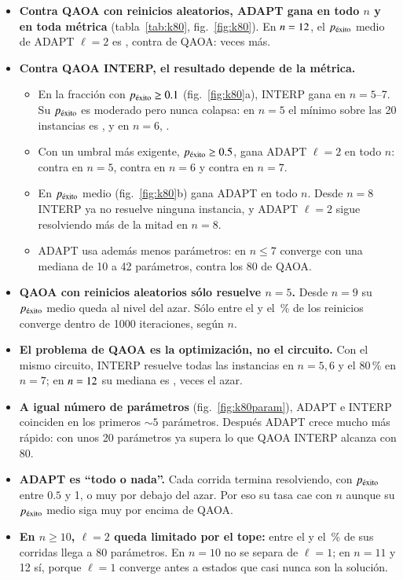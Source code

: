 \documentclass[11pt,a4paper]{article}
\newcommand{\pex}{p_{\rm \acute{e}xito}}
\begin{document}
\begin{itemize}
\item \textbf{Contra QAOA con reinicios aleatorios, ADAPT gana en todo $n$ y en toda métrica}
  (tabla~\ref{tab:k80}, fig.~\ref{fig:k80}). En $n=12$, el $\pex$ medio de ADAPT $\ell=2$ es
  \KMediaDosNmax{}, contra \KMediaQaoaNmax{} de QAOA: \KRazonNmax{} veces más.
\item \textbf{Contra QAOA INTERP, el resultado depende de la métrica.}
  \begin{itemize}
  \item En la fracción con $\pex\geq0.1$ (fig.~\ref{fig:k80}a), INTERP gana en $n=5$--7. Su $\pex$
    es moderado pero nunca colapsa: en $n=5$ el mínimo sobre las 20 instancias es
    \KMinInterpCinco, y en $n=6$, \KMinInterpSeis.
  \item Con un umbral más exigente, $\pex\geq0.5$, gana ADAPT $\ell=2$ en todo $n$: \KMedioAdaptCinco{}
    contra \KMedioInterpCinco{} en $n=5$, \KMedioAdaptSeis{} contra \KMedioInterpSeis{} en $n=6$ y
    \KMedioAdaptSiete{} contra \KMedioInterpSiete{} en $n=7$.
  \item En $\pex$ medio (fig.~\ref{fig:k80}b) gana ADAPT en todo $n$. Desde $n=8$ INTERP ya no
    resuelve ninguna instancia, y ADAPT $\ell=2$ sigue resolviendo más de la mitad en $n=8$.
  \item ADAPT usa además menos parámetros: en $n\leq7$ converge con una mediana de 10 a 42 parámetros, contra
    los 80 de QAOA.
  \end{itemize}
\item \textbf{QAOA con reinicios aleatorios sólo resuelve $n=5$.} Desde $n=9$ su $\pex$ medio queda
  al nivel del azar. Sólo entre el \KQaoaConvMin{} y el \KQaoaConvMax\,\% de los reinicios converge
  dentro de 1000 iteraciones, según $n$.
\item \textbf{El problema de QAOA es la optimización, no el circuito.} Con el mismo circuito, INTERP
  resuelve todas las instancias en $n=5,6$ y el 80\,\% en $n=7$; en $n=12$ su mediana es
  \KInterpMediana, \KInterpRazon{} veces el azar.
\item \textbf{A igual número de parámetros} (fig.~\ref{fig:k80param}), ADAPT e INTERP coinciden en los
  primeros $\sim5$ parámetros. Después ADAPT crece mucho más rápido: con unos 20 parámetros ya
  supera lo que QAOA INTERP alcanza con 80.
\item \textbf{ADAPT es ``todo o nada''.} Cada corrida termina resolviendo, con $\pex$ entre $0.5$ y
  1, o muy por debajo del azar. Por eso su tasa cae con $n$ aunque su $\pex$ medio siga muy por
  encima de QAOA.
\item \textbf{En $n\geq10$, $\ell=2$ queda limitado por el tope:} entre el \KTopeMin{} y el
  \KTopeMax\,\% de sus corridas llega a 80 parámetros. En $n=10$ no se separa de $\ell=1$; en
  $n=11$ y 12 sí, porque $\ell=1$ converge antes a estados que casi nunca son la solución.
\end{itemize}
\end{document}
